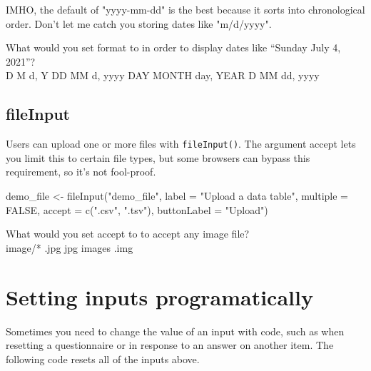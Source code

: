 \documentclass[
  oneside]{book}
\newenvironment{Shaded}{\begin{snugshade}}{\end{snugshade}}
\newcommand{\AttributeTok}[1]{\textcolor[rgb]{0.77,0.63,0.00}{#1}}
\newcommand{\ConstantTok}[1]{\textcolor[rgb]{0.00,0.00,0.00}{#1}}
\newcommand{\FunctionTok}[1]{\textcolor[rgb]{0.00,0.00,0.00}{#1}}
\newcommand{\NormalTok}[1]{#1}
\newcommand{\OtherTok}[1]{\textcolor[rgb]{0.56,0.35,0.01}{#1}}
\newcommand{\StringTok}[1]{\textcolor[rgb]{0.31,0.60,0.02}{#1}}
\begin{document}
\begin{info}
IMHO, the default of \StringTok{"yyyy-mm-dd"} is the best because it sorts into chronological order. Don't let me catch you storing dates like \StringTok{"m/d/yyyy"}.

\end{info}

What would you set \AttributeTok{format} to in order to display dates like ``Sunday July 4, 2021''?\\
D M d, Y DD MM d, yyyy DAY MONTH day, YEAR D MM dd, yyyy

\hypertarget{fileinput}{%
\subsection{fileInput}\label{fileinput}}

Users can upload one or more files with \texttt{fileInput}\texttt{()}. The argument \AttributeTok{accept} lets you limit this to certain file types, but some browsers can bypass this requirement, so it's not fool-proof.

\begin{Shaded}
\begin{Highlighting}[]
\NormalTok{demo\_file }\OtherTok{\textless{}{-}} \FunctionTok{fileInput}\NormalTok{(}\StringTok{"demo\_file"}\NormalTok{,}
                       \AttributeTok{label =} \StringTok{"Upload a data table"}\NormalTok{,}
                       \AttributeTok{multiple =} \ConstantTok{FALSE}\NormalTok{,}
                       \AttributeTok{accept =} \FunctionTok{c}\NormalTok{(}\StringTok{".csv"}\NormalTok{, }\StringTok{".tsv"}\NormalTok{),}
                       \AttributeTok{buttonLabel =} \StringTok{"Upload"}\NormalTok{)}
\end{Highlighting}
\end{Shaded}

What would you set \AttributeTok{accept} to to accept any image file?\\
image/* .jpg jpg images .img

\hypertarget{setting-inputs-programatically}{%
\section{Setting inputs programatically}\label{setting-inputs-programatically}}

Sometimes you need to change the value of an input with code, such as when resetting a questionnaire or in response to an answer on another item. The following code resets all of the inputs above.
\end{document}
